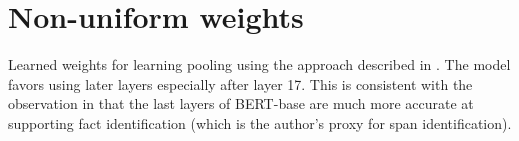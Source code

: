 \section{Non-uniform weights}
\label{apdx:non-uniform}

Learned weights for learning pooling using the approach described in \cite{tenney-etal-2019-bert}. The model favors using later layers especially after layer 17. This is consistent with the observation in \cite{van_Aken_2019} that the last layers of BERT-base are much more accurate at supporting fact identification (which is the author’s proxy for span identification).


\endgroup
